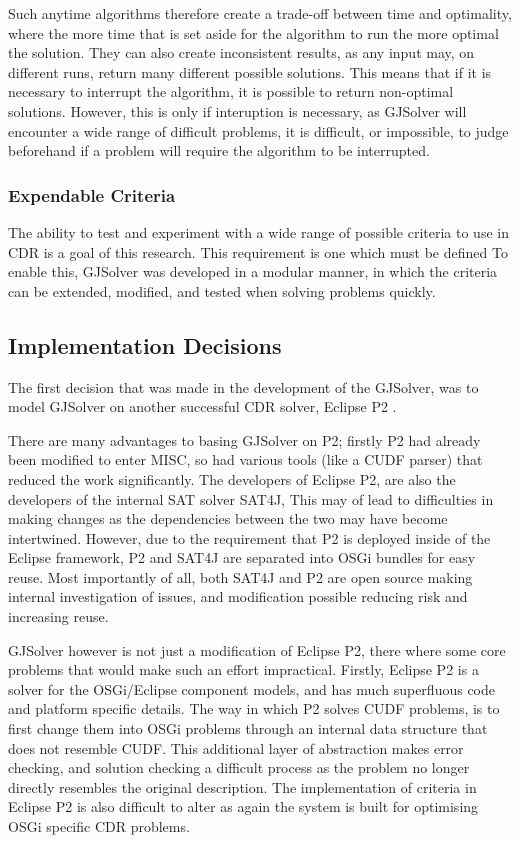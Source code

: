 Such anytime algorithms therefore create a trade-off between time and optimality, where the more time that is set aside for the algorithm to run the more optimal the solution. 
They can also create inconsistent results, as any input may, on different runs, return many different possible solutions.
This means that if it is necessary to interrupt the algorithm, it is possible to return non-optimal solutions.
However, this is only if interuption is necessary, as GJSolver will encounter a wide range of difficult problems, 
it is difficult, or impossible, to judge beforehand if a problem will require the algorithm to be interrupted. 

\subsubsection{Expendable Criteria}
The ability to test and experiment with a wide range of possible criteria to use in CDR is a goal of this research.
This requirement is one which must be defined
To enable this, GJSolver was developed in a modular manner, in which the criteria can be extended, modified, and tested when solving problems quickly.

\subsection{Implementation Decisions}
The first decision that was made in the development of the GJSolver, was to model GJSolver on another successful CDR solver, Eclipse P2 \citep{le_berre_dependency_2009,leBerre2010}.

There are many advantages to basing GJSolver on P2; firstly P2 had already been modified to enter MISC, so had various tools (like a CUDF parser) that reduced the work significantly.
The developers of Eclipse P2, are also the developers of the internal SAT solver SAT4J,
This may of lead to difficulties in making changes as the dependencies between the two may have become intertwined.
However, due to the requirement that P2 is deployed inside of the Eclipse framework, P2 and SAT4J are separated into OSGi bundles for easy reuse.
Most importantly of all, both SAT4J and P2 are open source making internal investigation of issues, and modification possible reducing risk and increasing reuse.

GJSolver however is not just a modification of Eclipse P2, there where some core problems that would make such an effort impractical.
Firstly, Eclipse P2 is a solver for the OSGi/Eclipse component models, and has much superfluous code and platform specific details.
The way in which P2 solves CUDF problems, is to first change them into OSGi problems through an internal data structure that does not resemble CUDF.
This additional layer of abstraction makes error checking, and solution checking a difficult process as the problem no longer directly resembles the original description.
The implementation of criteria in Eclipse P2 is also difficult to alter as again the system is built for optimising OSGi specific CDR problems.

